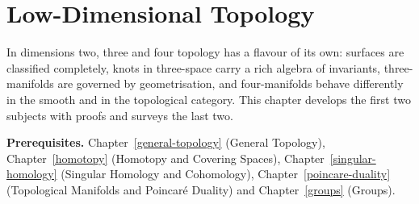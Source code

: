 \chapter{Low-Dimensional Topology}\label{low-dimensional-topology}

In dimensions two, three and four topology has a flavour of its own: surfaces are classified completely,
knots in three-space carry a rich algebra of invariants, three-manifolds are governed by geometrisation,
and four-manifolds behave differently in the smooth and in the topological category. This chapter
develops the first two subjects with proofs and surveys the last two.

\noindent\textbf{Prerequisites.} Chapter~\ref{general-topology} (General Topology), Chapter~\ref{homotopy} (Homotopy and Covering Spaces), Chapter~\ref{singular-homology} (Singular Homology and Cohomology), Chapter~\ref{poincare-duality} (Topological Manifolds and Poincar\'e Duality) and Chapter~\ref{groups} (Groups).

